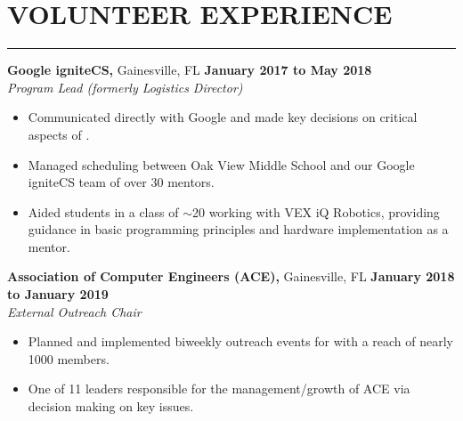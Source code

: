 \section*{VOLUNTEER EXPERIENCE}

\hrule \relax
\sectionheaderspace

\noindent\textbf{Google igniteCS,} Gainesville, FL \hfill\textbf{January 2017 to May 2018}\\
\textit{Program Lead (formerly Logistics Director)}
\begin{itemize}[noitemsep,nolistsep, label = {-}]
	\item Communicated directly with Google and made key decisions on critical aspects of .
	\item Managed scheduling between Oak View Middle School and our Google igniteCS team of over 30 mentors.
	\item Aided students in a class of $\sim$20 working with VEX iQ Robotics, providing guidance in basic programming principles and hardware implementation as a mentor.
\end{itemize} 
\subsectionspace

\noindent\textbf{Association of Computer Engineers (ACE),} Gainesville, FL \hfill\textbf{January 2018 to January 2019}\\
\textit{External Outreach Chair}
\begin{itemize}[noitemsep,nolistsep, label={-}]
	\item Planned and implemented biweekly outreach events for  with a reach of nearly 1000 members.
	\item One of 11 leaders responsible for the management/growth of ACE via decision making on key issues.
\end{itemize}
\subsectionspace